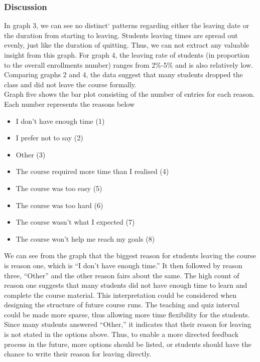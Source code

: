 \documentclass[12pt,]{article}
\providecommand{\tightlist}{%
\setlength{\itemsep}{0pt}\setlength{\parskip}{0pt}}
\begin{document}
\hypertarget{discussion-1}{%
\subsubsection{Discussion}\label{discussion-1}}

In graph 3, we can see no distinct` patterns regarding either the
leaving date or the duration from starting to leaving. Students leaving
times are spread out evenly, just like the duration of quitting. Thus,
we can not extract any valuable insight from this graph. For graph 4,
the leaving rate of students (in proportion to the overall enrollments
number) ranges from 2\%-5\% and is also relatively low. Comparing graphs
2 and 4, the data suggest that many students dropped the class and did
not leave the course formally.\\
\hfill\break Graph five shows the bar plot consisting of the number of
entries for each reason. Each number represents the reasons below

\begin{itemize}
\tightlist
\item
  I don't have enough time (1)
\item
  I prefer not to say (2)
\item
  Other (3)
\item
  The course required more time than I realised (4)
\item
  The course was too easy (5)
\item
  The course was too hard (6)
\item
  The course wasn't what I expected (7)
\item
  The course won't help me reach my goals (8)
\end{itemize}

We can see from the graph that the biggest reason for students leaving
the course is reason one, which is ``I don't have enough time.'' It then
followed by reason three, ``Other'' and the other reason fairs about the
same. The high count of reason one suggests that many students did not
have enough time to learn and complete the course material. This
interpretation could be considered when designing the structure of
future course runs. The teaching and quiz interval could be made more
sparse, thus allowing more time flexibility for the students. Since many
students answered ``Other,'' it indicates that their reason for leaving
is not stated in the options above. Thus, to enable a more directed
feedback process in the future, more options should be listed, or
students should have the chance to write their reason for leaving
directly.
\end{document}
